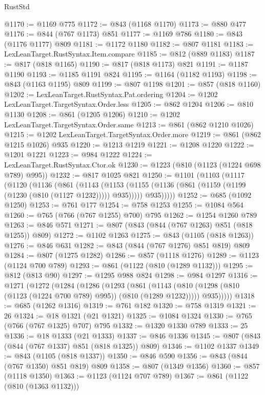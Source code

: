 \begin{lexlean}{RustStd}
\begin{coremodule}
@1170 := @1169 @775
@1172 := @843 (@1168 @1170)
@1173 := @880 @477
@1176 := @844 (@767 @1173) @851
@1177 := @1169 @786
@1180 := @843 (@1176 @1177) @809
@1181 := @1172 @1180
@1182 := @807 @1181
@1183 := LexLeanTarget.RustSyntax.Item.compare
@1185 := @812 (@889 @1183)
@1187 := @817 (@818 @1165)
@1190 := @817 (@818 @1173) @821
@1191 := @1187 @1190
@1193 := @1185 @1191 @824
@1195 := @1164 (@1182 @1193)
@1198 := @843 (@1163 @1195) @809
@1199 := @807 @1198
@1201 := @857 (@818 @1160)
@1202 := LexLeanTarget.RustSyntax.Pat.ordering
@1204 := @1202 LexLeanTarget.TargetSyntax.Order.less
@1205 := @862 @1204
@1206 := @810 @1130
@1208 := @861 (@1205 @1206)
@1210 := @1202 LexLeanTarget.TargetSyntax.Order.same
@1213 := @861 (@862 @1210 @1026)
@1215 := @1202 LexLeanTarget.TargetSyntax.Order.more
@1219 := @861 (@862 @1215 @1026) @935
@1220 := @1213 @1219
@1221 := @1208 @1220
@1222 := @1201 @1221
@1223 := @984 @1222
@1224 := LexLeanTarget.RustSyntax.Ctor.ok
@1230 := @1223 (@810 (@1123 (@1224 @698 @789) @995))
@1232 := @817 @1025 @821
@1250 := @1101
    (@1103
      (@1117
        (@1120
          (@1136
            (@861
              (@1143
                (@1153 (@1155 (@1136 (@861 (@1159 (@1199 (@1230 (@810 (@1127 @1232))))) @935)))))
              @935)))))
@1252 := @685 (@1092 @1250)
@1253 := @761 @177
@1254 := @758 @1253
@1255 := @1084 @564
@1260 := @765 (@766 (@767 @1255) @700) @795
@1262 := @1254 @1260 @789
@1263 := @846 @571
@1271 := @807 (@843 (@844 (@767 @1263) @851 (@818 @1255)) @809)
@1272 := @1102 @1263
@1275 := @843 (@1105 (@818 @1263))
@1276 := @846 @631
@1282 := @843 (@844 (@767 @1276) @851 @819) @809
@1284 := @807 (@1275 @1282)
@1286 := @857 (@1118 @1276)
@1289 := @1123 (@1124 @700 @789)
@1293 := @861 (@1122 (@810 (@1289 @1132)))
@1295 := @812 (@813 @90)
@1297 := @1295 @988 @824
@1298 := @984 @1297
@1316 := @1271
    (@1272
      (@1284
        (@1286
          (@1293
            (@861
              (@1143 (@810 (@1298 (@810 (@1123 (@1224 @700 @789) @995)) (@810 (@1289 @1232)))))
              @935)))))
@1318 := @685 (@1262 @1316)
@1319 := @761 @182
@1320 := @758 @1319
@1321 := 26
@1324 := @18 @1321 (@21 @1321)
@1325 := @1084 @1324
@1330 := @765 (@766 (@767 @1325) @707) @795
@1332 := @1320 @1330 @789
@1333 := 25
@1336 := @18 @1333 (@21 @1333)
@1337 := @846 @1336
@1345 := @807 (@843 (@844 (@767 @1337) @851 (@818 @1325)) @809)
@1346 := @1102 @1337
@1349 := @843 (@1105 (@818 @1337))
@1350 := @846 @590
@1356 := @843 (@844 (@767 @1350) @851 @819) @809
@1358 := @807 (@1349 @1356)
@1360 := @857 (@1118 @1350)
@1363 := @1123 (@1124 @707 @789)
@1367 := @861 (@1122 (@810 (@1363 @1132)))

\end{coremodule}
\end{lexlean}
